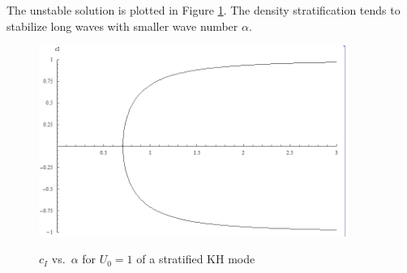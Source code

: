 The unstable solution is plotted in Figure \ref{kh2}. The density
stratification tends to stabilize long waves with smaller wave
number $\alpha$.
\begin{figure}[htpb]
  \centering
  \includegraphics[width=0.9\textwidth]{kh2.png}\\
  \caption{$c_I$ vs.~$\alpha$ for $U_0=1$ of a stratified KH mode}\label{kh2}
\end{figure}
